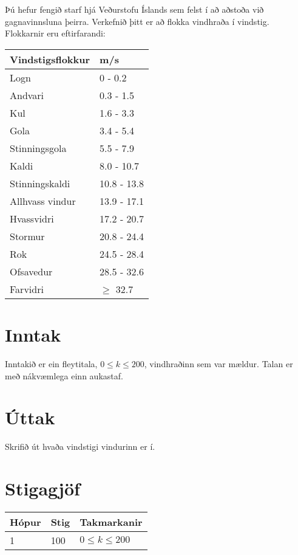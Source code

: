 
Þú hefur fengið starf hjá Veðurstofu Íslands sem felst í að aðstoða við gagnavinnsluna þeirra.
Verkefnið þitt er að flokka vindhraða í vindstig.
Flokkarnir eru eftirfarandi:

\begin{tabular}{|l|l|}
    \hline
    Vindstigsflokkur & m/s         \\ \hline
    Logn            & 0 - 0.2     \\ \hline
    Andvari         & 0.3 - 1.5   \\ \hline
    Kul             & 1.6 - 3.3   \\ \hline
    Gola            & 3.4 - 5.4   \\ \hline
    Stinningsgola   & 5.5 - 7.9   \\ \hline
    Kaldi           & 8.0 - 10.7  \\ \hline
    Stinningskaldi  & 10.8 - 13.8 \\ \hline
    Allhvass vindur & 13.9 - 17.1 \\ \hline
    Hvassvidri      & 17.2 - 20.7 \\ \hline
    Stormur         & 20.8 - 24.4 \\ \hline
    Rok             & 24.5 - 28.4 \\ \hline
    Ofsavedur       & 28.5 - 32.6 \\ \hline
    Farvidri        & $\geq$ 32.7 \\ \hline
\end{tabular}


\section*{Inntak}
Inntakið er ein fleytitala, $0 \leq k \leq 200$, vindhraðinn sem var mældur. Talan er með nákvæmlega einn aukastaf.

\section*{Úttak}
Skrifið út hvaða vindstigi vindurinn er í.

\section*{Stigagjöf}
\begin{tabular}{|l|l|l|}
    \hline
    Hópur & Stig & Takmarkanir         \\ \hline
    1     & 100  & $0 \leq k \leq 200$ \\ \hline
\end{tabular}

